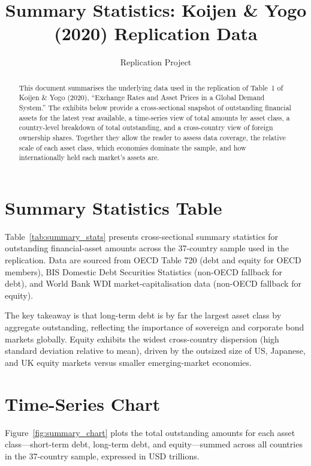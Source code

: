 \documentclass{article}
\title{Summary Statistics: Koijen \& Yogo (2020) Replication Data}
\author{Replication Project}
\date{}
\begin{document}
\maketitle

\begin{abstract}
This document summarises the underlying data used in the replication of
Table~1 of Koijen \& Yogo (2020), ``Exchange Rates and Asset Prices in a
Global Demand System.''
The exhibits below provide a cross-sectional snapshot of outstanding financial
assets for the latest year available, a time-series view of total amounts
by asset class, a country-level breakdown of total outstanding, and a
cross-country view of foreign ownership shares.  Together they allow the
reader to assess data coverage, the relative scale of each asset class,
which economies dominate the sample, and how internationally held each
market's assets are.
\end{abstract}

\section{Summary Statistics Table}

Table~\ref{tab:summary_stats} presents cross-sectional summary statistics for
outstanding financial-asset amounts across the 37-country sample used in the
replication.
Data are sourced from OECD Table 720 (debt and equity for OECD members),
BIS Domestic Debt Securities Statistics (non-OECD fallback for debt), and
World Bank WDI market-capitalisation data (non-OECD fallback for equity).

The key takeaway is that long-term debt is by far the largest asset class
by aggregate outstanding, reflecting the importance of sovereign and
corporate bond markets globally.  Equity exhibits the widest cross-country
dispersion (high standard deviation relative to mean), driven by the
outsized size of US, Japanese, and UK equity markets versus smaller
emerging-market economies.



\section{Time-Series Chart}

Figure~\ref{fig:summary_chart} plots the total outstanding amounts for each
asset class---short-term debt, long-term debt, and equity---summed across all
countries in the 37-country sample, expressed in USD trillions.
\end{document}
